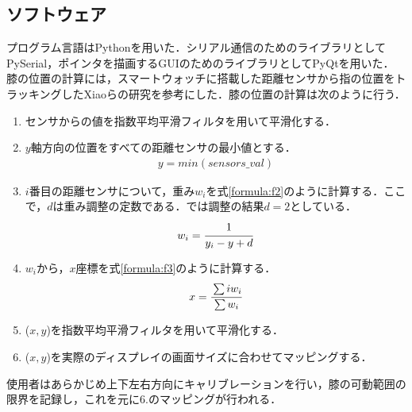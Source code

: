 \subsection{ソフトウェア} 
プログラム言語はPythonを用いた．シリアル通信のためのライブラリとしてPySerial，ポインタを描画するGUIのためのライブラリとしてPyQtを用いた．
膝の位置の計算には，スマートウォッチに搭載した距離センサから指の位置をトラッキングしたXiaoら\cite{Xiao:2018:LOP:3173574.3173669}の研究を参考にした．膝の位置の計算は次のように行う．
\begin{enumerate}
	\item センサからの値を指数平均平滑フィルタを用いて平滑化する．
	\item $y$軸方向の位置をすべての距離センサの最小値とする．
		\begin{eqnarray}
		 	y = min(sensors\_val)
		 	\label{formula:f1}
		\end{eqnarray}
	\item $i$番目の距離センサについて，重み$w_i$を式\ref{formula:f2}のように計算する．ここで，$d$は重み調整の定数である．\SysName では調整の結果$d=2$としている．
		\begin{eqnarray}
			w_i = \cfrac{1}{y_i - y + d}
		\label{formula:f2}
	\end{eqnarray}
	\item $w_i$から，$x$座標を式\ref{formula:f3}のように計算する．
		\begin{eqnarray}
		 	x =\cfrac{\sum iw_i}{\sum w_i}
		 	\label{formula:f3}
		\end{eqnarray} 
	\item ($x,y$)を指数平均平滑フィルタを用いて平滑化する．
	\item ($x,y$)を実際のディスプレイの画面サイズに合わせてマッピングする．
\end{enumerate}
使用者はあらかじめ上下左右方向にキャリブレーションを行い，膝の可動範囲の限界を記録し，これを元に6.のマッピングが行われる．

